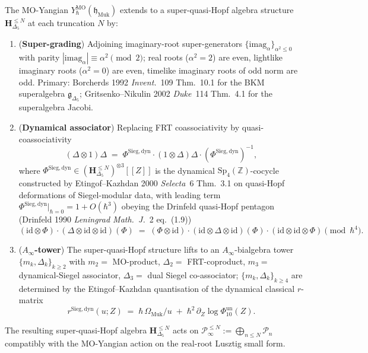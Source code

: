\begin{theorem}
\label{thm:modtr-super-quasi-hopf-mo}
The MO-Yangian $Y^{\mathrm{MO}}_\hbar(\mathfrak h_{\mathrm{Muk}})$
extends to a super-quasi-Hopf algebra structure
$\mathbf H_{\Delta_5}^{\leq N}$ at each truncation $N$ by:
\begin{enumerate}[label=\textup{(\roman*)}]
\item (\textbf{Super-grading}) Adjoining imaginary-root super-generators
$\{\mathrm{imag}_\alpha\}_{\alpha^2\leq 0}$ with parity
$|\mathrm{imag}_\alpha| \equiv \alpha^2 \pmod 2$; real roots
($\alpha^2 = 2$) are even, lightlike imaginary roots ($\alpha^2 = 0$)
are even, timelike imaginary roots of odd norm are odd.
Primary: Borcherds 1992 \emph{Invent.}~109 Thm.~10.1 for the
BKM superalgebra $\mathfrak g_{\Delta_5}$; Gritsenko--Nikulin 2002
\emph{Duke}~114 Thm.~4.1 for the superalgebra Jacobi.
\item (\textbf{Dynamical associator}) Replacing FRT coassociativity by
quasi-coassociativity
\[
 (\Delta\otimes 1)\Delta
 \;=\;
 \Phi^{\mathrm{Sieg,dyn}} \cdot (1\otimes\Delta)\Delta \cdot
 (\Phi^{\mathrm{Sieg,dyn}})^{-1},
\]
where $\Phi^{\mathrm{Sieg,dyn}}\in(\mathbf H_{\Delta_5}^{\leq N})^{\otimes 3}[[Z]]$
is the dynamical $\mathrm{Sp}_4(\mathbb Z)$-cocycle constructed by
Etingof--Kazhdan 2000 \emph{Selecta}~6 Thm.~3.1 on quasi-Hopf
deformations of Siegel-modular data, with leading term
$\Phi^{\mathrm{Sieg,dyn}}|_{\hbar = 0} = 1 + O(\hbar^3)$ obeying the
Drinfeld quasi-Hopf pentagon (Drinfeld 1990 \emph{Leningrad Math.\ J.}~2
eq.~(1.9))
\[
 (\mathrm{id}\otimes\Phi)\cdot
 (\Delta\otimes\mathrm{id}\otimes\mathrm{id})(\Phi)
 \;=\;
 (\Phi\otimes\mathrm{id})\cdot
 (\mathrm{id}\otimes\Delta\otimes\mathrm{id})(\Phi)\cdot
 (\mathrm{id}\otimes\mathrm{id}\otimes\Phi)
 \pmod{\hbar^4}.
\]
\item (\textbf{$A_\infty$-tower}) The super-quasi-Hopf structure lifts
to an $A_\infty$-bialgebra tower $\{m_k,\Delta_k\}_{k\geq 2}$ with
$m_2 =$ MO-product, $\Delta_2 =$ FRT-coproduct, $m_3 =$
dynamical-Siegel associator, $\Delta_3 =$ dual Siegel co-associator;
$\{m_k,\Delta_k\}_{k\geq 4}$ are determined by the Etingof--Kazhdan
quantisation of the dynamical classical $r$-matrix
\[
 r^{\mathrm{Sieg,dyn}}(u; Z)
 \;=\;
 \hbar\,\Omega_{\mathrm{Muk}}/u
 \;+\;
 \hbar^2\,\partial_Z\log\Phi_{10}^{\mathrm{un}}(Z).
\]
\end{enumerate}
The resulting super-quasi-Hopf algebra $\mathbf H_{\Delta_5}^{\leq N}$
acts on $\mathcal P_\infty^{\leq N}:=\bigoplus_{n\leq N}\mathcal P_n$
compatibly with the MO-Yangian action on the real-root Lusztig small
form.
\end{theorem}

